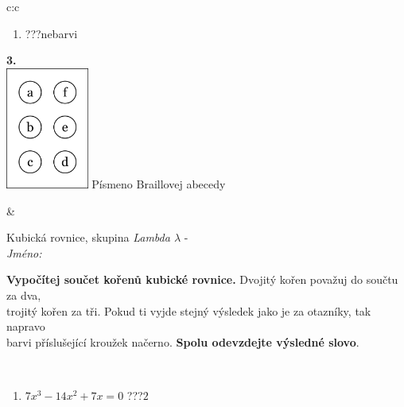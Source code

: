 \documentclass[10pt]{report}
\begin{document}
\begin{tabular}{c:c}
\begin{minipage}[c][104.5mm][t]{0.5\linewidth}
\begin{center}
\begin{minipage}{0.79\linewidth}
\begin{center}
\begin{varwidth}{\linewidth}
\begin{enumerate}
\item \quad \dotfill\; ???\;\dotfill \quad nebarvi
\end{enumerate}
\end{varwidth}
\end{center}
\end{minipage}
\begin{minipage}{0.20\linewidth}
\begin{center}
{\Huge\bfseries 3.} \\[2mm]
\includegraphics[height=40mm]{../images/braille.png}
{\small Písmeno Braillovej abecedy}
\end{center}
\end{minipage}
\end{center}
\end{minipage}
&
\begin{minipage}[c][104.5mm][t]{0.5\linewidth}
\begin{center}
\vspace{7mm}
{\huge Kubická rovnice, skupina \textit{Lambda $\lambda$} -}\\[5mm]
\textit{Jméno:}\phantom{xxxxxxxxxxxxxxxxxxxxxxxxxxxxxxxxxxxxxxxxxxxxxxxxxxxxxxxxxxxxxxxxx}\\[5mm]
\begin{minipage}{0.95\linewidth}
\begin{center}
\textbf{Vypočítej součet kořenů kubické rovnice.} Dvojitý kořen považuj do součtu za dva,\\trojitý kořen za tři. Pokud ti vyjde stejný výsledek jako je za otazníky, tak napravo\\barvi příslušející kroužek načerno. \textbf{Spolu odevzdejte výsledné slovo}.
\end{center}
\end{minipage}
\\[1mm]
\begin{minipage}{0.79\linewidth}
\begin{center}
\begin{varwidth}{\linewidth}
\begin{enumerate}
\Large
\item $7x^3-14x^2+7x=0$\quad \dotfill\; ???\;\dotfill \quad $2$

\end{enumerate}
\end{varwidth}
\end{center}
\end{minipage}
\end{center}
\end{minipage}
\end{tabular}
\end{document}
